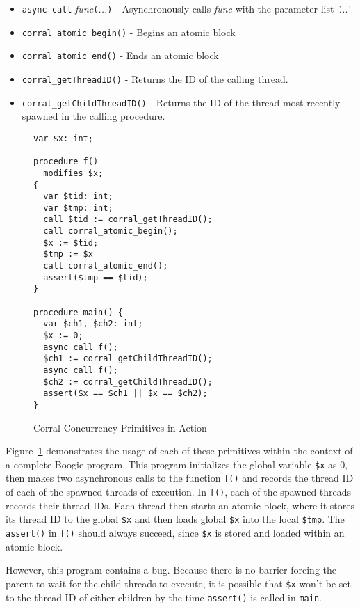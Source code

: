 \begin{itemize}
\item \lstinline|async call| \emph{func}\lstinline|(|\emph{...}\lstinline|)| - Asynchronously calls \emph{func} with the parameter list \emph{'...'}
\item \lstinline|corral_atomic_begin()| - Begins an atomic block
\item \lstinline|corral_atomic_end()| - Ends an atomic block
\item \lstinline|corral_getThreadID()| - Returns the ID of the calling thread.
\item \lstinline|corral_getChildThreadID()| - Returns the ID of the
  thread most recently spawned in the calling procedure. 
\end{itemize}

\begin{figure}[h]
\centering
\begin{lstlisting}[language=boogie]
var $x: int;

procedure f() 
  modifies $x;
{
  var $tid: int;
  var $tmp: int;
  call $tid := corral_getThreadID();
  call corral_atomic_begin();
  $x := $tid;
  $tmp := $x
  call corral_atomic_end();
  assert($tmp == $tid);
}

procedure main() {
  var $ch1, $ch2: int;
  $x := 0;
  async call f();
  $ch1 := corral_getChildThreadID();
  async call f();
  $ch2 := corral_getChildThreadID();
  assert($x == $ch1 || $x == $ch2);
}
\end{lstlisting}
\caption{Corral Concurrency Primitives in Action}
\label{fig:corralprimitives}
\end{figure}

Figure~\ref{fig:corralprimitives} demonstrates the usage of each of
these primitives within the context of a complete Boogie program.
This program initializes the global variable \lstinline|$x| as 0, then
makes two asynchronous calls to the function \lstinline|f()| and
records the thread ID of each of the spawned threads of execution.  In
\lstinline|f()|, each of the spawned threads records their thread IDs.
Each thread then starts an atomic block, where it stores its thread ID
to the global \lstinline|$x| and then loads global \lstinline|$x| into
the local \lstinline|$tmp|.  The \lstinline|assert()| in
\lstinline|f()| should always succeed, since \lstinline|$x| is stored
and loaded within an atomic block. 

However, this program contains a bug.  Because there is no barrier
forcing the parent to wait for the child threads to execute, it is
possible that \lstinline|$x| won't be set to the thread ID of either
children by the time \lstinline|assert()| is called in
\lstinline|main|.

